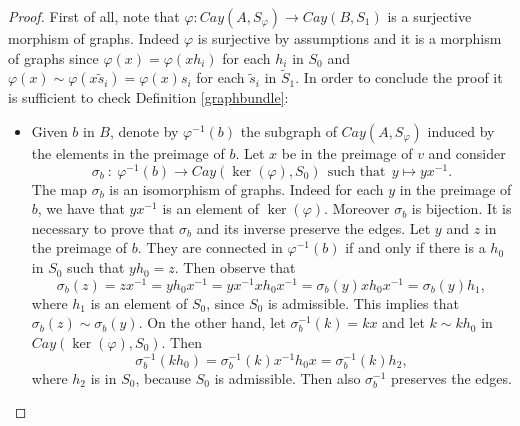 \documentclass{amsart}
\theoremstyle{definition}
\numberwithin{equation}{section}
\begin{document}
\begin{proof}
First of all, note that $\varphi: Cay(A, S_{\varphi}) \longrightarrow Cay(B, S_1)$ is a surjective morphism of graphs. Indeed $\varphi$ is surjective by assumptions and it is a morphism of graphs since $\varphi(x) = \varphi(xh_i)$ for each $h_i$ in $S_0$ and $\varphi(x) \sim \varphi(x\widetilde{s}_i) = \varphi(x)s_i$ for each $\widetilde{s}_i$ in $\widetilde{S}_1$.
In order to conclude the proof it is sufficient to check  Definition \ref{graphbundle}:
\begin{itemize}
    \item[Step 1.] Given $b$ in $B$, denote by $\varphi^{-1}(b)$ the subgraph of $Cay(A, S_{\varphi})$ induced by the elements in the preimage of $b$. Let $x$  be in the preimage of $v$ and consider
\begin{equation}
       \sigma_b \ : \ \varphi^{-1}(b) \longrightarrow Cay(\ker(\varphi), S_0) \  \ \mbox{such that} \ \ y \longmapsto yx^{-1}. 
\end{equation}
The map $\sigma_b$ is an isomorphism of graphs. Indeed for each $y$ in the preimage of $b$, we have that $yx^{-1}$ is an element of $\ker(\varphi)$. Moreover $\sigma_b$ is bijection. It is necessary to prove that $\sigma_b$ and its inverse preserve the edges. Let $y$ and $z$ in the preimage of $b$. They are connected in $\varphi^{-1}(b)$ if and only if there is a $h_0$ in $S_0$ such that $yh_0 = z$. Then observe that 
\begin{equation}
    \sigma_b(z) = zx^{-1} = yh_0x^{-1} = yx^{-1}xh_0x^{-1} = \sigma_b(y)xh_0x^{-1} = \sigma_b(y)h_1,
\end{equation}
where $h_1$ is an element of $S_0$, since $S_0$ is admissible. This implies that $\sigma_b(z) \sim \sigma_b(y)$. On the other hand, let $\sigma_b^{-1}(k) = kx$ and let $k \sim kh_0$ in $Cay(\ker(\varphi), S_0)$. Then \begin{equation}\sigma_b^{-1}(kh_0) = \sigma_b^{-1}(k) x^{-1}h_0x = \sigma_b^{-1}(k)h_2,\end{equation} where $h_2$ is in $S_0$, because $S_0$ is admissible. Then also $\sigma_b^{-1}$ preserves the edges.



\end{itemize}
\end{proof}
\end{document}
